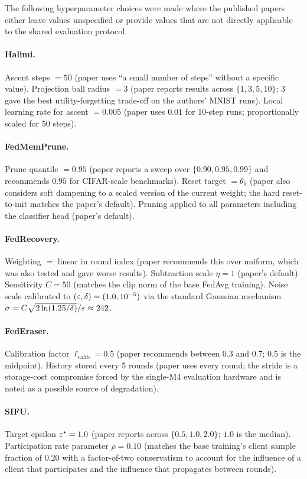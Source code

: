 The following hyperparameter choices were made where the published papers
either leave values unspecified or provide values that are not directly
applicable to the shared evaluation protocol.

\paragraph{Halimi.} Ascent steps $=50$ (paper uses ``a small number of
steps'' without a specific value). Projection ball radius $=3$ (paper
reports results across $\{1, 3, 5, 10\}$; $3$ gave the best utility-forgetting
trade-off on the authors' MNIST runs). Local learning rate for ascent
$=0.005$ (paper uses $0.01$ for 10-step runs; proportionally scaled for 50
steps).

\paragraph{FedMemPrune.} Prune quantile $=0.95$ (paper reports a sweep over
$\{0.90, 0.95, 0.99\}$ and recommends $0.95$ for CIFAR-scale benchmarks).
Reset target $=\theta_0$ (paper also considers soft dampening to a scaled
version of the current weight; the hard reset-to-init matches the paper's
default). Pruning applied to all parameters including the classifier head
(paper's default).

\paragraph{FedRecovery.} Weighting $=$ linear in round index (paper
recommends this over uniform, which was also tested and gave worse results).
Subtraction scale $\eta=1$ (paper's default). Sensitivity $C=50$ (matches
the clip norm of the base FedAvg training). Noise scale calibrated to
$(\varepsilon, \delta) = (1.0, 10^{-5})$ via the standard Gaussian mechanism
$\sigma = C\sqrt{2\ln(1.25/\delta)}/\varepsilon \approx 242$.

\paragraph{FedEraser.} Calibration factor $\ell_{\text{calib}} = 0.5$ (paper
recommends between $0.3$ and $0.7$; $0.5$ is the midpoint). History stored
every 5 rounds (paper uses every round; the stride is a storage-cost
compromise forced by the single-M4 evaluation hardware and is noted as a
possible source of degradation).

\paragraph{SIFU.} Target epsilon $\varepsilon^{\star}=1.0$ (paper reports across
$\{0.5, 1.0, 2.0\}$; $1.0$ is the median). Participation rate parameter
$\rho=0.10$ (matches the base training's client sample fraction of 0.20
with a factor-of-two conservatism to account for the influence of a client
that participates and the influence that propagates between rounds).
